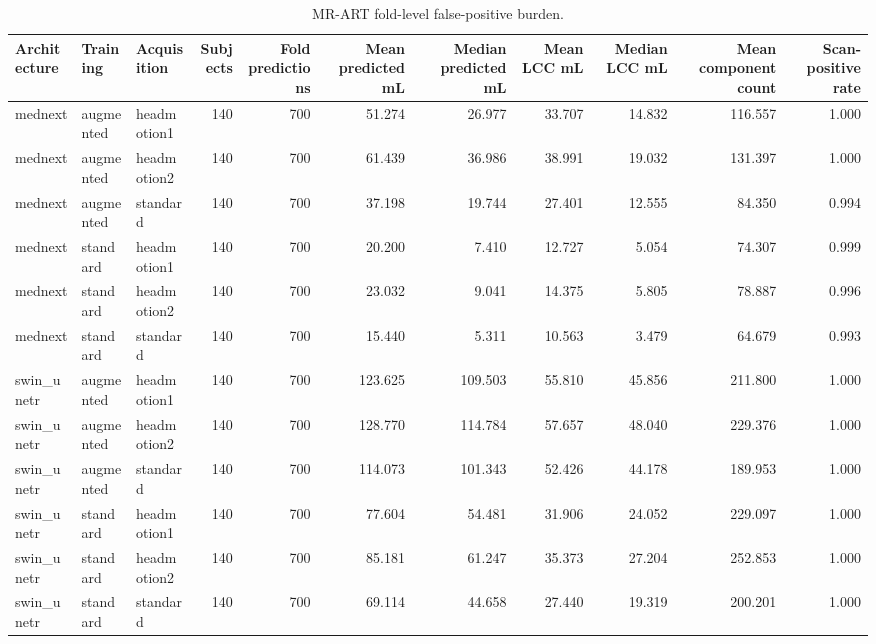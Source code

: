 \begin{table}
\caption{MR-ART fold-level false-positive burden.}
\label{tab:mrart_burden}
\begin{tabular}{lllrrrrrrrr}
\toprule
Architecture & Training & Acquisition & Subjects & Fold predictions & Mean predicted mL & Median predicted mL & Mean LCC mL & Median LCC mL & Mean component count & Scan-positive rate \\
\midrule
mednext & augmented & headmotion1 & 140 & 700 & 51.274 & 26.977 & 33.707 & 14.832 & 116.557 & 1.000 \\
mednext & augmented & headmotion2 & 140 & 700 & 61.439 & 36.986 & 38.991 & 19.032 & 131.397 & 1.000 \\
mednext & augmented & standard & 140 & 700 & 37.198 & 19.744 & 27.401 & 12.555 & 84.350 & 0.994 \\
mednext & standard & headmotion1 & 140 & 700 & 20.200 & 7.410 & 12.727 & 5.054 & 74.307 & 0.999 \\
mednext & standard & headmotion2 & 140 & 700 & 23.032 & 9.041 & 14.375 & 5.805 & 78.887 & 0.996 \\
mednext & standard & standard & 140 & 700 & 15.440 & 5.311 & 10.563 & 3.479 & 64.679 & 0.993 \\
swin\_unetr & augmented & headmotion1 & 140 & 700 & 123.625 & 109.503 & 55.810 & 45.856 & 211.800 & 1.000 \\
swin\_unetr & augmented & headmotion2 & 140 & 700 & 128.770 & 114.784 & 57.657 & 48.040 & 229.376 & 1.000 \\
swin\_unetr & augmented & standard & 140 & 700 & 114.073 & 101.343 & 52.426 & 44.178 & 189.953 & 1.000 \\
swin\_unetr & standard & headmotion1 & 140 & 700 & 77.604 & 54.481 & 31.906 & 24.052 & 229.097 & 1.000 \\
swin\_unetr & standard & headmotion2 & 140 & 700 & 85.181 & 61.247 & 35.373 & 27.204 & 252.853 & 1.000 \\
swin\_unetr & standard & standard & 140 & 700 & 69.114 & 44.658 & 27.440 & 19.319 & 200.201 & 1.000 \\
\bottomrule
\end{tabular}
\end{table}
